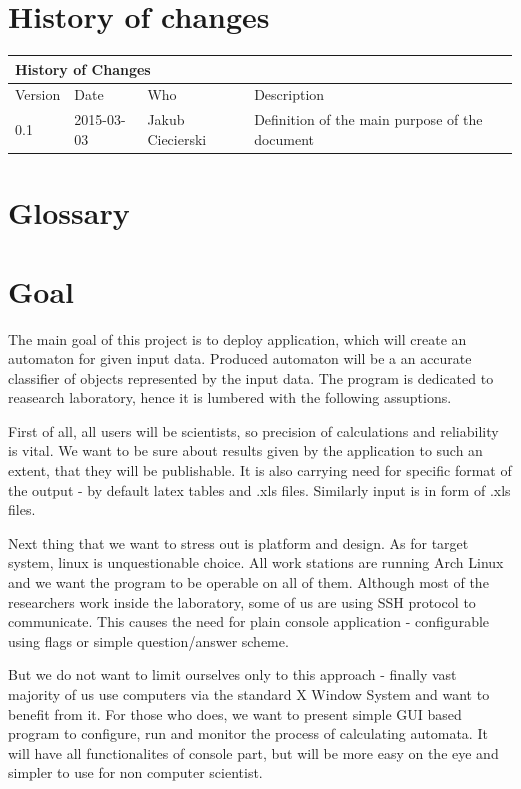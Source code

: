\documentclass{article}
\begin{document}
\section{History of changes}

\begin{table}[h]
\hspace*{-2.1cm}
\large
\begin{tabular}{|l|l|l|l|}
\hline
\multicolumn{4}{|l|}{\cellcolor[HTML]{C0C0C0}History of Changes} \\ \hline
Version         & Date         & Who        & Description        \\ \hline
0.1         & 2015-03-03         & Jakub Ciecierski        & Definition of the main purpose of the document       \\ \hline
\end{tabular}
\end{table}


\section{Glossary} 

\newpage
\section{Goal}
The main goal of this project is to deploy application, which will create an automaton for given input data. Produced automaton will be a an accurate classifier of objects represented
by the input data. The program is dedicated to reasearch laboratory, hence it is lumbered with the following assuptions.


First of all, all users will be scientists, so precision of calculations and reliability is vital. We want to be sure about results given by the application to such an extent, that they will be publishable. It is also carrying need for specific format of the output - by default latex tables and .xls files. Similarly input is in form of .xls files.


Next thing that we want to stress out is platform and design. As for target system, linux is unquestionable choice. All work stations are running Arch Linux and we want the program to be operable on all of them. Although most of the researchers work inside the laboratory, some of us are using SSH protocol to communicate. This causes the need for plain console application - configurable using flags or simple question/answer scheme. 

But we do not want to limit ourselves only to this approach - finally vast majority of us use computers via the standard X Window System and want to benefit from it. For those who does, we want to present simple GUI based program to configure, run and monitor the process of calculating automata. It will have all functionalites of console part, but will be more easy on the eye and simpler to use for non computer scientist.
\end{document}
